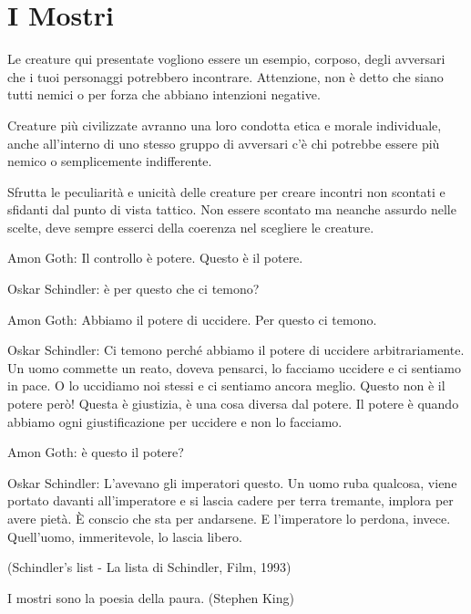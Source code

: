 \section{I Mostri}

\begin{narratore}[Un po' di mostri…]
	Le creature qui presentate vogliono essere un esempio, corposo, degli avversari che i tuoi personaggi potrebbero incontrare. Attenzione, non è detto che siano tutti nemici o per forza che abbiano intenzioni negative.

	Creature più civilizzate avranno una loro condotta etica e morale individuale, anche all'interno di uno stesso gruppo di avversari c'è chi potrebbe essere più nemico o semplicemente indifferente.

	Sfrutta le peculiarità e unicità delle creature per creare incontri non scontati e sfidanti dal punto di vista tattico. Non essere scontato ma neanche assurdo nelle scelte, deve sempre esserci della coerenza nel scegliere le creature.
\end{narratore}

\bigskip

\begin{enfasi}{

Amon Goth: Il controllo è potere. Questo è il potere.

Oskar Schindler: è per questo che ci temono?

Amon Goth: Abbiamo il potere di uccidere. Per questo ci temono.

Oskar Schindler: Ci temono perché abbiamo il potere di uccidere arbitrariamente. Un uomo commette un reato, doveva pensarci, lo facciamo uccidere e ci sentiamo in pace. O lo uccidiamo noi stessi e ci sentiamo ancora meglio. Questo non è il potere però! Questa è giustizia, è una cosa diversa dal potere. Il potere è quando abbiamo ogni giustificazione per uccidere e non lo facciamo.

Amon Goth: è questo il potere?

Oskar Schindler: L'avevano gli imperatori questo. Un uomo ruba qualcosa, viene portato davanti all'imperatore e si lascia cadere per terra tremante, implora per avere pietà. È conscio che sta per andarsene. E l'imperatore lo perdona, invece. Quell'uomo, immeritevole, lo lascia libero.

(Schindler's list - La lista di Schindler, Film, 1993)

\medskip

I mostri sono la poesia della paura. (Stephen King)
}\end{enfasi}

